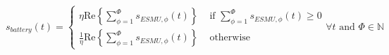 \begin{equation}
	s_{battery}(t) = 
	\begin{cases}
		\eta\text{Re}\left\{\sum_{\phi=1}^{\Phi}s_{ESMU,\phi}(t)\right\} &\text{ if } \sum_{\phi=1}^{\Phi}s_{ESMU,\phi}(t) \geq 0\\
		\frac{1}{\eta}\text{Re}\left\{\sum_{\phi=1}^{\Phi}s_{ESMU,\phi}(t)\right\} &\text{ otherwise}
	\end{cases} \forall t \text{ and } \Phi \in \mathbb{N}
	\label{ch1:equ:battery-power-definition}
\end{equation}